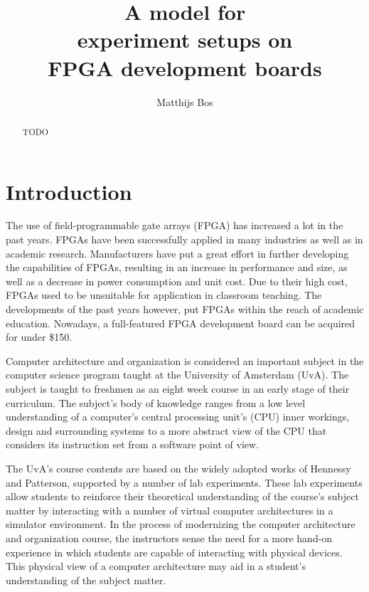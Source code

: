 \documentclass[openright]{template/uva-bachelor-thesis}
\title{A model for \\experiment setups on\\ FPGA development boards}
\author{Matthijs Bos}
\begin{document}
 

\maketitle

\begin{abstract}
TODO
\end{abstract}

\tableofcontents

\chapter{Introduction}
\label{chapterintroduction}
The use of field-programmable gate arrays (FPGA) has increased a lot in the past years. FPGAs have been successfully applied in many industries as well as in academic research. Manufacturers have put a great effort in further developing the capabilities of FPGAs, resulting in an increase in performance and size, as well as a decrease in power consumption and unit cost. Due to their high cost, FPGAs used to be unsuitable for application in classroom teaching. The developments of the past years however, put FPGAs within the reach of academic education. Nowadays, a full-featured FPGA development board can be acquired for under \$150. 

Computer architecture and organization is considered an important subject in the computer science program taught at the University of Amsterdam (UvA). The subject is taught to freshmen as an eight week course in an early stage of their curriculum. The subject's body of knowledge ranges from a low level understanding of a computer's central processing unit's (CPU) inner workings, design and surrounding systems to a more abstract view of the CPU that considers its instruction set from a software point of view.

The UvA's course contents are based on the widely adopted works of Hennessy and Patterson, supported by a number of lab experiments. These lab experiments allow students to reinforce their theoretical understanding of the course's subject matter by interacting with a number of virtual computer architectures in a simulator environment. In the process of modernizing the computer architecture and organization course, the instructors sense the need for a more hand-on experience in which students are capable of interacting with physical devices. This physical view of a computer architecture may aid in a student's understanding of the subject matter.
\end{document}
